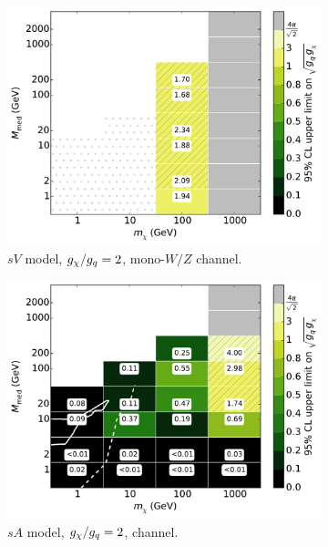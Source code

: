 \begin{figure}
\begin{subfigure}[t]{0.32\textwidth}
    \centering
    \includegraphics[width=1.\textwidth]{figures/grid_basepoints_SVD_rat2_monoWZ.pdf}
    \caption{$sV$ model, $g_{\chi}/g_q = 2$, mono-$W/Z$ channel.}
    \vspace{0.75cm}
  \end{subfigure}
  \begin{subfigure}[t]{0.32\textwidth}
    \centering
    \includegraphics[width=1.\textwidth]{figures/grid_basepoints_SAD_rat2_monojet.pdf}
    \caption{$sA$ model, $g_{\chi}/g_q = 2$, \monojet channel.}
  \end{subfigure}
  \begin{subfigure}[t]{0.32\textwidth}
    \centering

\end{subfigure}
\end{figure}
